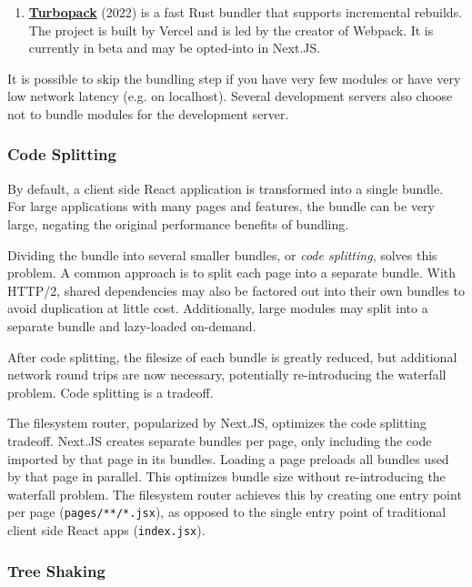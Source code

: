\documentclass{article}
\begin{document}
\begin{enumerate}
  \item \href{https://turbo.build/pack}{\textbf{Turbopack}} (2022) is a fast Rust bundler that
    supports incremental rebuilds. The project is built by Vercel and is led by the creator of
    Webpack. It is currently in beta and may be opted-into in Next.JS.
\end{enumerate}

It is possible to skip the bundling step if you have very few modules or have very low network
latency (e.g. on localhost). Several development servers also choose not to bundle modules for the
development server.

\subsubsection{Code Splitting}

By default, a client side React application is transformed into a single bundle. For large
applications with many pages and features, the bundle can be very large, negating the original
performance benefits of bundling.

Dividing the bundle into several smaller bundles, or \textit{code splitting}, solves this problem. A
common approach is to split each page into a separate bundle. With HTTP/2, shared dependencies may
also be factored out into their own bundles to avoid duplication at little cost. Additionally, large
modules may split into a separate bundle and lazy-loaded on-demand.

After code splitting, the filesize of each bundle is greatly reduced, but additional network round
trips are now necessary, potentially re-introducing the waterfall problem. Code splitting is a
tradeoff.

The filesystem router, popularized by Next.JS, optimizes the code splitting tradeoff. Next.JS
creates separate bundles per page, only including the code imported by that page in its bundles.
Loading a page preloads all bundles used by that page in parallel. This optimizes bundle size
without re-introducing the waterfall problem. The filesystem router achieves this by creating one
entry point per page (\texttt{pages/**/*.jsx}), as opposed to the single entry point of traditional
client side React apps (\texttt{index.jsx}).

\subsubsection{Tree Shaking}
\end{document}
